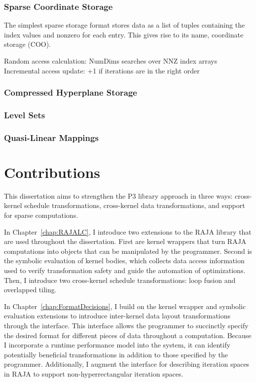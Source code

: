 \subsubsection{Sparse Coordinate Storage}

The simplest sparse storage format stores data as a list of tuples containing the index values and nonzero for each entry.
This gives rise to its name, coordinate storage (COO).


Random access calculation: NumDims searches over NNZ index arrays
Incremental access update: +1 if iterations are in the right order

\subsubsection{Compressed Hyperplane Storage}




\subsubsection{Level Sets}

\subsubsection{Quasi-Linear Mappings}

\section{Contributions}

This dissertation aims to strengthen the P3 library approach in three ways: cross-kernel schedule transformations, cross-kernel data transformations, and support for sparse computations.

In Chapter~\ref{chap:RAJALC}, I introduce two extensions to the RAJA library that are used throughout the dissertation.
First are kernel wrappers that turn RAJA computations into objects that can be manipulated by the programmer.
Second is the symbolic evaluation of kernel bodies, which collects data access information used to verify transformation safety and guide the automation of optimizations.
Then, I introduce two cross-kernel schedule transformations: loop fusion and overlapped tiling.

In Chapter~\ref{chap:FormatDecisions}, I build on the kernel wrapper and symbolic evaluation extensions to introduce inter-kernel data layout transformations through the \FormatDecisions{} interface.
This interface allows the programmer to succinctly specify the desired format for different pieces of data throughout a computation.
Because I incorporate a runtime performance model into the system, it can identify potentially beneficial transformations in addition to those specified by the programmer.
Additionally, I augment the interface for describing iteration spaces in RAJA to support non-hyperrectangular iteration spaces.


